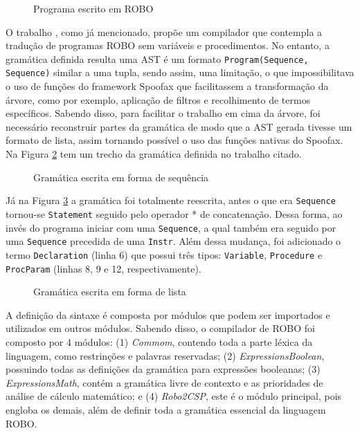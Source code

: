\begin{figure}[h]
\caption{Programa escrito em ROBO}

\label{fig:roboprogram}
\end{figure}

O trabalho \cite{nogueira}, como já mencionado, propõe um compilador que contempla a tradução de programas ROBO sem variáveis e procedimentos. No entanto, a gramática definida resulta uma AST é um formato  \texttt{Program(Sequence, Sequence)} similar a uma tupla, sendo assim, uma limitação, o que impossibilitava o uso de funções do framework Spoofax que facilitassem a transformação da árvore, como por exemplo, aplicação de filtros e recolhimento de termos específicos. Sabendo disso, para facilitar o trabalho em cima da árvore, foi necessário reconstruir partes da gramática de modo que a AST gerada tivesse um formato de lista, assim tornando possível o uso das funções nativas do Spoofax. Na Figura \ref{fig:gramatica_antes} tem um trecho da gramática definida no trabalho citado.

\begin{figure}[h]
\caption{Gramática escrita em forma de sequência}

\label{fig:gramatica_antes}
\end{figure}

Já na Figura \ref{fig:gramatica} a gramática foi totalmente reescrita, antes o que era \texttt{Sequence} tornou-se \texttt{Statement} seguido pelo operador * de concatenação. Dessa forma, ao invés do programa iniciar com uma \texttt{Sequence}, a qual também era seguido por uma \texttt{Sequence} precedida de uma \texttt{Instr}. Além dessa mudança, foi adicionado o termo \texttt{Declaration} (linha 6) que possui três tipos: \texttt{Variable}, \texttt{Procedure} e \texttt{ProcParam} (linhas 8, 9 e 12, respectivamente).

\begin{figure}[h]
\caption{Gramática escrita em forma de lista}

\label{fig:gramatica}
\end{figure}

A definição da sintaxe é composta por módulos que podem ser importados e utilizados em outros módulos. Sabendo disso, o compilador de ROBO foi composto por 4 módulos: (1) \textit{Commom}, contendo toda a parte léxica da linguagem, como restrinções e palavras reservadas; (2) \textit{ExpressionsBoolean}, possuindo todas as definições da gramática para expressões booleanas; (3) \textit{ExpressionsMath}, contém a gramática livre de contexto e as prioridades de análise de cálculo matemático; e (4) \textit{Robo2CSP}, este é o módulo principal, pois engloba os demais, além de definir toda a gramática essencial da linguagem ROBO.

